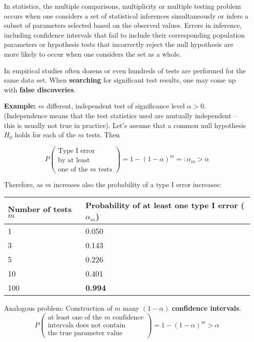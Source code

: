 \documentclass[
]{book}
\begin{document}
In statistics, the multiple comparisons, multiplicity or multiple testing problem occurs when one considers a set of statistical inferences simultaneously or infers a subset of parameters selected based on the observed values. Errors in inference, including confidence intervals that fail to include their corresponding population parameters or hypothesis tests that incorrectly reject the null hypothesis are more likely to occur when one considers the set as a whole.

In empirical studies often dozens or even hundreds of tests are performed for the same data set. When \textbf{searching} for
significant test results, one may come up with \textbf{false discoveries}.

\textbf{Example:} \(m\) different, independent test of significance level \(\alpha>0\). (Independence means that the test statistics used are mutually independent -- this is usually not true in practice). Let's assume that a common null hypothesis \(H_0\) holds for each of the \(m\) tests. Then

\[
P \begin{pmatrix}
      \text{Type I error}\\
      \text{by at least} \\
      \text{one of the $m$ tests}
  \end{pmatrix}
= 1 - (1 - \alpha)^m =: \alpha_m>\alpha
\]

Therefore, as \(m\) increases also the probability of a type I error increases:

\begin{longtable}[]{@{}ll@{}}
\toprule
Number of tests \(m\) & Probability of at least one type I error (\(\alpha_m\)) \\
\midrule
\endhead
1 & 0.050 \\
3 & 0.143 \\
5 & 0.226 \\
10 & 0.401 \\
100 & \textbf{0.994} \\
\bottomrule
\end{longtable}

\hfill\break

Analogous problem: Construction of \(m\) many \((1-\alpha)\) \textbf{confidence intervals}.
\[
P \begin{pmatrix}
      \text{at least one of the $m$ confidence} \\
      \text{intervals does not contain} \\
      \text{the true parameter value} \end{pmatrix}
    = 1 - (1-\alpha)^m>\alpha
\]
\end{document}
